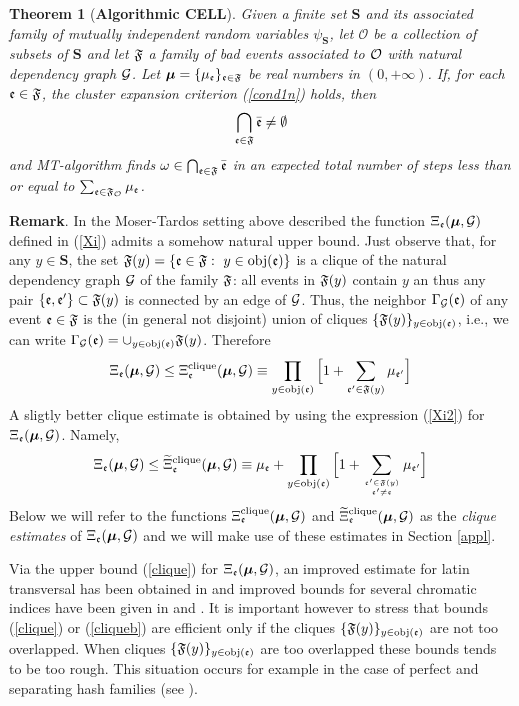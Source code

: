 \documentclass[11pt]{article}
\newtheorem{theo}{Theorem}[section]
\let\m=\mu \let\n=\nu \let\o=\omega    \let\p=\pi \let\ph=\varphi
\let\\=\noindent
\def\ee{\end{equation}}
\def\be{\begin{equation}}
\def\0{\emptyset}
\begin{document}
\begin{theo}[{\bf Algorithmic  CELL}]\label{MosTar} Given  a finite set $\mathbf{S}$  and its associated family
of mutually independent random variables $\psi_\mathbf{S}$,
let ${\mathcal O}$ be a collection  of subsets of $\mathbf{S}$ and  let ${\mathfrak{F}}$ a family of bad events associated to ${{\mathcal O}}$ with natural dependency graph
${\cal G}$.
Let  $\bm{\mu}=\{\mu_{\mathfrak{e}}\}_{{\mathfrak{e}}\in {\mathfrak{F}}}$ be  real numbers
 in $(0,+\infty)$. If, for each ${\mathfrak{e}}\in {\mathfrak{F}}$, the cluster expansion criterion (\ref{cond1n}) holds,
then
$$
\bigcap_{\ev\in \fa}\bar \ev\neq\0
$$
and
 MT-algorithm finds $\o\in\bigcap_{\ev\in \fa}\bar \ev$ in an  expected total number of  steps less than or equal to
$\sum_{\ev\in \fa_\A}\m_\ev$.
\end{theo}
{\bf Remark}. In the Moser-Tardos setting
above described the function $\Xi_\ev(\bm \m,\GG)$ defined in (\ref{Xi}) admits
a somehow natural  upper bound.
Just observe that, for  any $y\in {\mathbf{S}}$, the set   ${\mathfrak{F}}(y)=\{{\mathfrak{e}}\in {\mathfrak{F}}:~y\in {\rm obj}({\mathfrak{e}})\}$
is a clique of the natural dependency graph ${\cal G}$ of the family ${\mathfrak{F}}$: all events in ${\mathfrak{F}}(y)$ contain  $y$ an thus any pair $\{{\mathfrak{e}},{\mathfrak{e}}'\}\subset {\mathfrak{F}}(y)$ is connected by an edge of ${\cal G}$.
Thus, the neighbor $\Gamma_{\cal G}({\mathfrak{e}})$ of any event  ${\mathfrak{e}}\in {\mathfrak{F}}$ is  the (in general not disjoint) union of cliques $\{{\mathfrak{F}}(y)\}_{y\in {\rm obj}({\mathfrak{e}})}$, i.e., we can write
$\Gamma_{\cal G}({\mathfrak{e}})= \cup_{y\in {\rm obj}({\mathfrak{e}})}{\mathfrak{F}}(y)$.
Therefore
\be\label{clique}
\Xi_\ev(\bm \m,\GG)\le  \Xi^{\rm clique}_\ev(\bm \m,\GG)\equiv\prod_{y\in \obj(\ev)}\Big[1+ \sum_{\ev'\in \fa(y)}\m_{\ev'}\Big]
\ee
A sligtly better clique estimate is obtained by using the expression (\ref{Xi2}) for $ \Xi_\ev(\bm \m,\GG)$. Namely,
\be\label{cliqueb}
\Xi_\ev(\bm \m,\GG)\le \widetilde\Xi^{\rm clique}_\ev(\bm \m,\GG)\equiv\m_\ev +\prod_{y\in \obj(\ev)}\Big[1+ \sum_{\ev'\in \fa(y)\atop \ev'\neq \ev}\m_{\ev'}\Big]
\ee
Below we will  refer to the functions $\Xi^{\rm clique}_\ev(\bm \m,\GG)$ and $ \widetilde\Xi^{\rm clique}_\ev(\bm \m,\GG)$
as the {\it clique estimates} of  $\Xi_\ev(\bm \m,\GG)$ and we will make use of  these estimates in Section \ref{appl}.

\\Via the upper bound (\ref{clique}) for $\Xi_\ev(\bm \m,\GG)$,  an improved estimate for latin transversal has been obtained
in \cite{BFPS} and  improved bounds
for  several chromatic indices  have been given in   \cite{NPS} and \cite{BKP}. It is important however to stress that
bounds (\ref{clique}) or (\ref{cliqueb}) are efficient only if the cliques $\{{\mathfrak{F}}(y)\}_{y\in {\rm obj}({\mathfrak{e}})}$ are not too overlapped.
When cliques  $\{{\mathfrak{F}}(y)\}_{y\in {\rm obj}({\mathfrak{e}})}$  are too overlapped these bounds  tends to be too rough. This situation occurs for example
in the case of perfect and separating hash families (see \cite{PS}).
\end{document}
